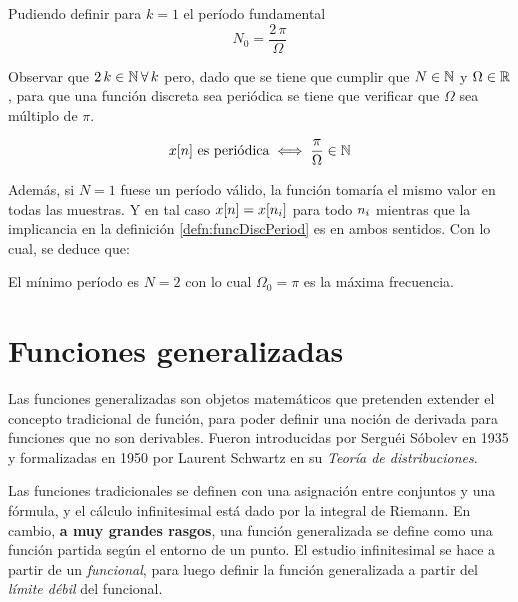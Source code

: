Pudiendo definir para $k=1$ el período fundamental
\begin{equation*}
    N_0 = \frac{2 \, \pi}{\Omega}
\end{equation*}

Observar que $2 \, k \in \mathbb{N} \, \forall \, k$ pero, dado que se tiene que cumplir que $N \in \mathbb{N}$ y $\Omega \in \mathbb{R}$, para que una función discreta sea periódica se tiene que verificar que $\Omega$ sea múltiplo de $\pi$.

\begin{mdframed}[style=PropertyFrame]
    \begin{prop}
    \end{prop}
    \begin{equation*}
        x[n] \text{ es periódica} \iff \frac{\pi}{\Omega} \in \mathbb{N}
    \end{equation*}
\end{mdframed}

Además, si $N=1$ fuese un período válido, la función tomaría el mismo valor en todas las muestras.
Y en tal caso $x[n] = x[n_i]$ para todo $n_i$ mientras que la implicancia en la definición \ref{defn:funcDiscPeriod} es en ambos sentidos.
Con lo cual, se deduce que:

\begin{mdframed}[style=PropertyFrame]
    \begin{prop}
    \end{prop}
    El mínimo período es $N=2$ con lo cual $\Omega_0 = \pi$ es la máxima frecuencia.
\end{mdframed}

\section{Funciones generalizadas}

Las funciones generalizadas son objetos matemáticos que pretenden extender el concepto tradicional de función, para poder definir una noción de derivada para funciones que no son derivables.
Fueron introducidas por Serguéi Sóbolev en 1935 y formalizadas en 1950 por Laurent Schwartz en su \emph{Teoría de distribuciones}.

Las funciones tradicionales se definen con una asignación entre conjuntos y una fórmula, y el cálculo infinitesimal está dado por la integral de Riemann.
En cambio, \textbf{a muy grandes rasgos}, una función generalizada se define como una función partida según el entorno de un punto.
El estudio infinitesimal se hace a partir de un \emph{funcional}, para luego definir la función generalizada a partir del \emph{límite débil} del funcional.


